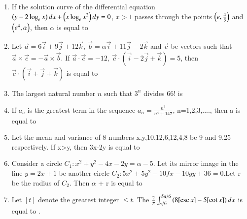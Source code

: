 \documentclass[journal]{IEEEtran}
\numberwithin{equation}{enumi}
\numberwithin{figure}{enumi}
\begin{document}
\begin{enumerate}[start=16]
\item If the solution curve of the differential equation $\left(y - 2 \log_e x\right)dx + \left(x \log_e x^2\right)dy = 0$, $x > 1$ passes through the points $\left(e, \frac{4}{3}\right)$ and  $\left(e^4, \alpha\right)$, then $\alpha$ is equal to 
\item Let \(\vec{a} = 6\vec{i} + 9\vec{j} + 12\vec{k}, \ \vec{b} = \alpha\vec{i} + 11\vec{j} - 2\vec{k}\) and \(\vec{c}\) be vectors such that \(\vec{a} \times \vec{c} = -\vec{a} \times \vec{b}\). If \(\vec{a} \cdot \vec{c} = -12, \ \vec{c} \cdot (\vec{i} - 2\vec{j} + \vec{k}) = 5\), then \(\vec{c} \cdot (\vec{i} + \vec{j} + \vec{k})\) is equal to 
\item The largest natural number $n$ such that $3^n$ divides 66! is
\item If $a_a$ is the greatest term in the sequence $a_n=\frac{n^3}{n^4 + 147}$, n=1,2,3,...., then a is equal to 
\item Let the mean and variance of 8 numbers x,y,10,12,6,12,4,8 be 9 and 9.25 respectively. If x>y, then 3x-2y is equal to 
\item Consider a circle $C_1 : x^2+y^2-4x-2y=\alpha-5$. Let its mirror  image in the line $y=2x+1$ be another circle $C_2 : 5x^2+5y^2 -10fx-10gy+36=0 $.Let r be the radius of $C_2$. Then $\alpha$ + r is equal to
\item Let $[t]$ denote the greatest integer $\leq t$. The $\frac{2}{\pi} \int_{\pi/6}^{5\pi/6} \left(8[\csc x] - 5[\cot x] \right) dx$ is equal to \underline{\hspace{2cm}}.






\end{enumerate}
\end{document}
